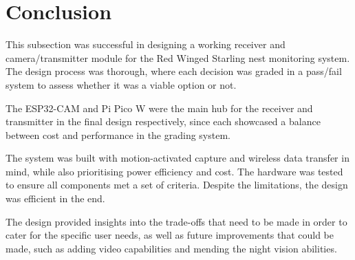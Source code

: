 \documentclass[class=report,11pt,crop=false]{standalone}
\begin{document}
\section{Conclusion} \label{sc: HW_C}
This subsection was successful in designing a working receiver and camera/transmitter module for the Red Winged Starling nest monitoring system. The design process was thorough, where each decision was graded in 
a pass/fail system to assess whether it was a viable option or not. 

The ESP32-CAM and Pi Pico W were the main hub for the receiver and transmitter in the final design respectively, since each showcased a balance between cost and performance in the grading system. 

The system was built with motion-activated capture and wireless data transfer in mind, while also prioritising power efficiency and cost. The hardware was tested to ensure all components met a set of criteria. Despite the limitations, the design was efficient in the end. 

The design provided insights into the trade-offs that need to be made in order to cater for the specific user needs, as well as future improvements that could be made, such as adding video capabilities and mending the night vision abilities. 

\ifstandalone

\printnoidxglossary[type=\acronymtype,nonumberlist]
\fi
\end{document}
